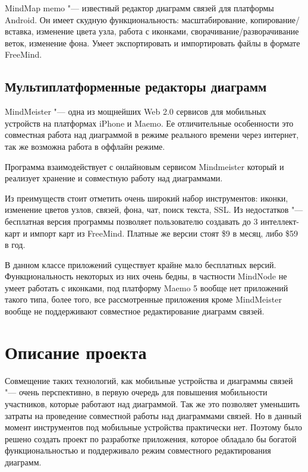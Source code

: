 MindMap memo "--- известный редактор диаграмм связей для платформы Android. Он имеет скудную функциональность: масштабирование, копирование/вставка, изменение цвета узла, работа с иконками, сворачивание/разворачивание веток, изменение фона. Умеет экспортировать и импортировать файлы в формате FreeMind.

\subsection{Мультиплатформенные редакторы диаграмм}

MindMeister "--- одна из мощнейших Web 2.0 сервисов для мобильных устройств на платформах iPhone и Maemo. Ее отличительные особенности это совместная работа над диаграммой в режиме реального времени через интернет, так же возможна работа в оффлайн режиме.

Программа взаимодействует с онлайновым сервисом Mindmeister который и реализует хранение и совместную работу над диаграммами.

Из преимуществ стоит отметить очень широкий набор инструментов: иконки, изменение цветов узлов, связей, фона, чат, поиск текста, SSL. Из недостатков "--- бесплатная версия программы позволяет пользователю создавать до 3 интеллект-карт и импорт карт из FreeMind. Платные же версии стоят \$9 в месяц, либо \$59 в год.

В данном классе приложений существует крайне мало бесплатных версий. Функциональность некоторых из них очень бедны, в частности MindNode не умеет работать с иконками, под платформу Maemo 5 вообще нет приложений такого типа, более того, все рассмотренные приложения кроме MindMeister вообще не поддерживают совместное редактирование диаграмм связей.

\section{Описание проекта}\label{sec:project_summary}

Совмещение таких технологий, как мобильные устройства и диаграммы связей "--- очень перспективно, в первую очередь для повышения мобильности участников, которые работают над диаграммой. Так же это позволяет уменьшить затраты на проведение совместной работы над диаграммами связей. Но в данный момент инструментов под мобильные устройства практически нет. Поэтому было решено создать проект по разработке приложения, которое обладало бы богатой функциональностью и поддерживало режим совместного редактирования диаграмм.

